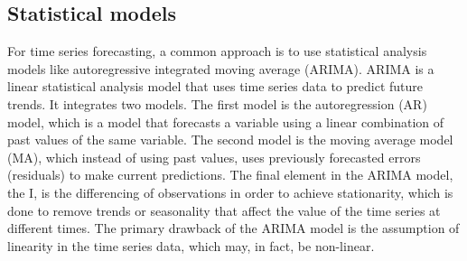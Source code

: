 \subsection{Statistical models}
For time series forecasting, a common approach is to use statistical analysis models like autoregressive integrated moving average (ARIMA).
ARIMA is a linear statistical analysis model that uses time series data to predict future trends.
It integrates two models.
The first model is the autoregression (AR) model, which is a model that forecasts a variable using a linear combination of past values of the same variable. 
The second model is the moving average model (MA), which instead of using past values, uses previously forecasted errors (residuals) to make current predictions. 
The final element in the ARIMA model, the I, is the differencing of observations in order to achieve stationarity, which is done to remove trends or seasonality that affect the value of the time series at different times. The primary drawback of the ARIMA model is the assumption of linearity in the time series data, which may, in fact, be non-linear.\cite{HybridArimaAndNN}\cite{ForecastinPrinciplesAndPractice}
